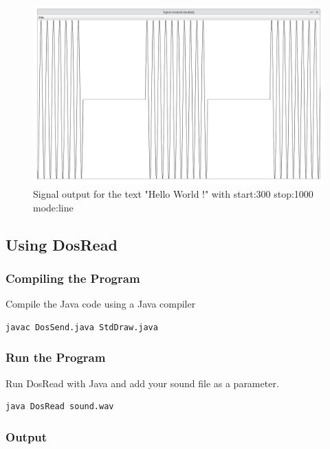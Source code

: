 \begin{figure}[!h]
	\begin{center}
		\includegraphics[width=15cm]{images/StdDraw1.png}
	\end{center}
	\caption{Signal output for the text "Hello World !" with start:300 stop:1000 mode:line}
\end{figure}

\subsection{Using DosRead}

\subsubsection{Compiling the Program}

Compile the Java code using a Java compiler

\begin{lstlisting}
javac DosSend.java StdDraw.java
\end{lstlisting}

\subsubsection{Run the Program}

Run DosRead with Java and add your sound file as a parameter.

\begin{lstlisting}
java DosRead sound.wav
\end{lstlisting}

\subsubsection{Output}

